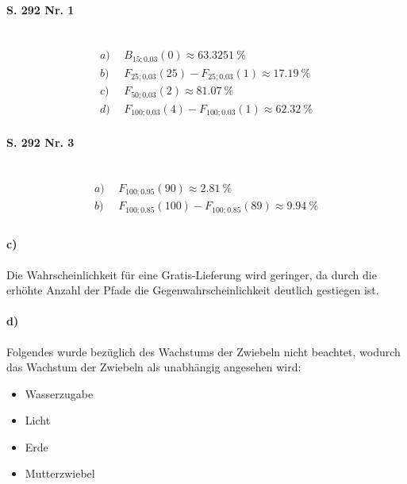 \documentclass[12pt,a4paper]{report}
\begin{document}
	\paragraph{S. 292 Nr. 1} \mbox{} \\
	\begin{align*}
		a)&\ \ B_{15;0.03}(0) \approx 63.3251\ \% \\
		b)&\ \ F_{25;0.03}(25) - F_{25;0.03}(1) \approx 17.19\ \% \\
		c)&\ \ F_{50;0.03}(2) \approx 81.07\ \% \\
		d)&\ \ F_{100;0.03}(4) - F_{100;0.03}(1) \approx 62.32\ \%
	\end{align*}
	\paragraph{S. 292 Nr. 3} \mbox{} \\
	\begin{align*}
		a)&\ \ F_{100;0.95}(90) \approx 2.81\ \% \\
		b)&\ \ F_{100;0.85}(100) - F_{100;0.85}(89) \approx 9.94\ \% \\
	\end{align*}
	\paragraph{c)} Die Wahrscheinlichkeit für eine Gratis-Lieferung wird geringer, da durch die erhöhte Anzahl der Pfade die Gegenwahrscheinlichkeit deutlich gestiegen ist.
	\paragraph{d)}
	Folgendes wurde bezüglich des Wachstums der Zwiebeln nicht beachtet, wodurch das Wachstum der Zwiebeln als unabhängig angesehen wird:
	\begin{itemize}
		\item Wasserzugabe
		\item Licht
		\item Erde
		\item Mutterzwiebel
	\end{itemize}
\end{document}
